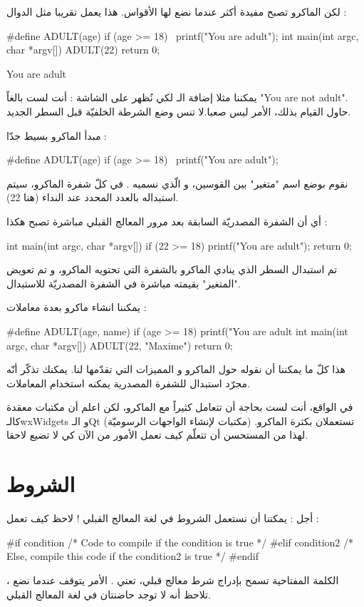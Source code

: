 لكن الماكرو تصبح مفيدة أكثر عندما نضع لها الأقواس. هذا يعمل تقريبا مثل الدوال :
\begin{Csource}
#define ADULT(age) if (age >= 18) \
                    printf("You are adult\n");
int main(int argc, char *argv[])
{
	ADULT(22)
	return 0;
}
\end{Csource}
\begin{Console}
You are adult
\end{Console}
\begin{information}
يمكننا مثلا إضافة الـ
لكي نُظهر على الشاشة : أنت لست بالغاً
"\textenglish{You are not adult}".
حاول القيام بذلك، الأمر ليس صعبا.لا تنس وضع الشرطة الخلفيّة
\InlineCode{\textbackslash}
قبل السطر الجديد.
\end{information}
مبدأ الماكرو بسيط جدّا :
\begin{Csource}
#define ADULT(age) if (age >= 18) \
                    printf("You are adult\n");
\end{Csource}
نقوم بوضع اسم "متغير" بين القوسين، و الّذي نسميه
.
في كلّ شفرة الماكرو،
\InlineCode{age}
سيتم استبداله بالعدد المحدد عند النداء (هنا 22).

أي أن الشفرة المصدريّة السابقة بعد مرور المعالج القبلي مباشرة تصبح هكذا :
\begin{Csource}
int main(int argc, char *argv[])
{
	if (22 >= 18)
		printf("You are adult\n");
	return 0;
}
\end{Csource}
تم استبدال السطر الذي ينادي الماكرو بالشفرة التي تحتويه الماكرو، و تم تعويض "المتغير"
\InlineCode{age}
بقيمته مباشرة في الشفرة المصدريّة للاستبدال.

يمكننا انشاء ماكرو بعدة معاملات :
\begin{Csource}
#define ADULT(age, name) if (age >= 18)
printf("You are adult %
int main(int argc, char *argv[])
{
	ADULT(22, "Maxime")
	return 0;
}
\end{Csource}
هذا كلّ ما يمكننا أن نقوله حول الماكرو و المميزات التي تقدّمها لنا. يمكنك تذكّر أنّه مجرّد استبدال للشفرة المصدرية يمكنه استخدام المعاملات.
\begin{information}
في الواقع، أنت لست بحاجة أن تتعامل كثيراً مع الماكرو، لكن اعلم أن مكتبات معقدة كالـ\textenglish{wxWidgets}
و الـ\textenglish{Qt}
(مكتبات لإنشاء الواجهات الرسوميّة) تستعملان بكثرة الماكرو. لهذا من المستحسن أن تتعلّم كيف تعمل الأمور من الآن كي لا تضيع لاحقا.
\end{information}

\section{الشروط}
أجل : يمكننا أن نستعمل الشروط في لغة المعالج القبلي ! لاحظ كيف تعمل :
\begin{Csource}
#if condition
  /* Code to compile if the condition is true */
#elif condition2
  /* Else, compile this code if the condition2 is true */
#endif
\end{Csource}
الكلمة المفتاحية
تسمح بإدراج شرط معالج قبلي،
تعني
.
الأمر يتوقف عندما نضع
،
تلاحظ أنه لا توجد حاضنتان في لغة المعالج القبلي.


